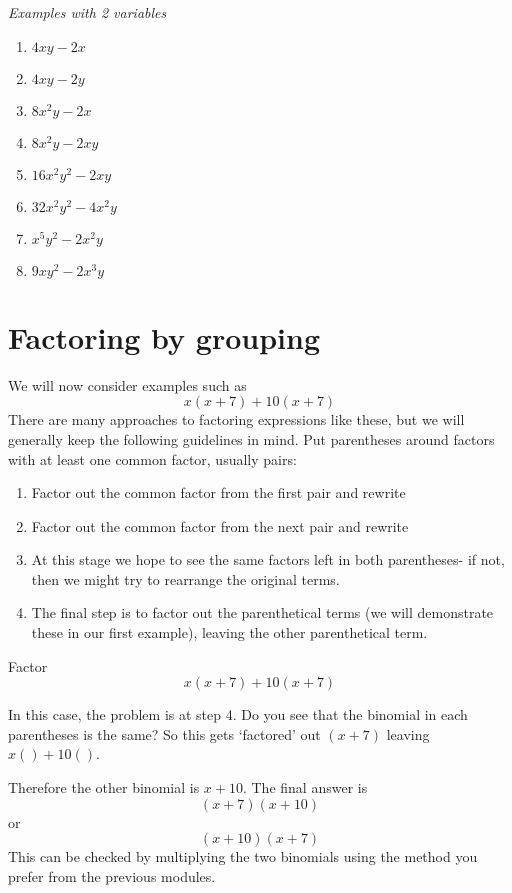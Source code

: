 {\em Examples with 2 variables}
\begin{multicols}{2}
	\begin{enumerate}
		\item $4xy-2x$
		\item $4xy-2y$
		\item $8x^2y-2x$
		\item $8x^2y-2xy$
		\item $16x^2y^2-2xy$
		\item $32x^2y^2-4x^2y$
		\item $x^5y^2-2x^2y$
		\item $9xy^2-2x^3y$
	\end{enumerate}
\end{multicols}

\section{Factoring by grouping}\label{sec:facbygroup}

We will now consider examples such as
\[
	x(x+7)+10(x+7)
\]
There are many approaches to factoring expressions like these, but we will generally keep the following guidelines in mind.
Put parentheses around factors with at least one common factor, usually pairs:
\begin{enumerate}
	\item Factor out the common factor from the first pair and rewrite
	\item Factor out the common factor from the next pair and rewrite
	\item At this stage we hope to see the same factors left in both parentheses- if not, then
	we might try to rearrange the original terms.
	\item The final step is to factor out the parenthetical terms (we will demonstrate these in our
	first example), leaving the other parenthetical term.
\end{enumerate} 

\begin{myexample}
Factor
\[
	x(x+7)+10(x+7)
\]
{}
\end{myexample}
\begin{myProof}
	In this case, the problem is at step 4. Do you see that the \gls{binomial} in each parentheses is the same? 
	So this gets `factored' out $(x+7)$ leaving $x()+10()$.
			
	Therefore the other binomial is $x+10$. The final answer is 
	\[
		(x+7)(x+10)
	\]
	or
	\[
		(x+10)(x+7)
	\]
	This can be checked by multiplying the two binomials using the method you prefer from
	the previous modules. 
\end{myProof} 

